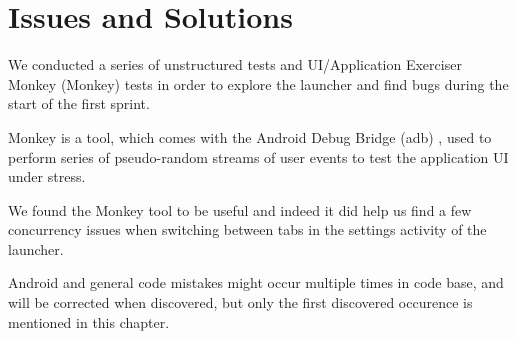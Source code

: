 
\chapter{Issues and Solutions}

We conducted a series of unstructured tests and UI/Application Exerciser Monkey (Monkey) \parencite{android_monkey} tests in order to explore the launcher and find bugs during the start of the first sprint. 

Monkey is a tool, which comes with the Android Debug Bridge (adb) \parencite{android_adb}, used to perform series of pseudo-random streams of user events to test the application UI under stress.

We found the Monkey tool to be useful and indeed it did help us find a few concurrency issues when switching between tabs in the settings activity of the launcher.

Android and general code mistakes might occur multiple times in code base, and will be corrected when discovered, but only the first discovered occurence is mentioned in this chapter. 









